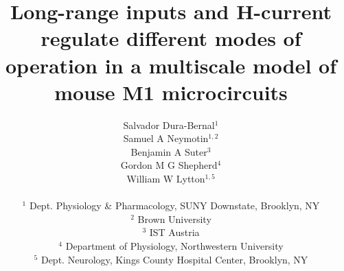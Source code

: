 \documentclass[]{article}
\begin{document}
\title{Long-range inputs and H-current regulate different modes of operation in a multiscale model of mouse M1 microcircuits}

\author{
Salvador Dura-Bernal$^{1}$\\
Samuel A Neymotin$^{1,2}$\\
Benjamin A Suter$^{3}$\\
Gordon M G Shepherd$^{4}$\\
William W Lytton$^{1,5}$\\
\\
$^1$ Dept. Physiology \& Pharmacology, SUNY Downstate, Brooklyn, NY \\
$^2$ Brown University \\
$^3$ IST Austria \\
$^4$ Department of Physiology, Northwestern University \\
$^5$ Dept. Neurology, Kings County Hospital Center, Brooklyn, NY}

\titlepage
\maketitle







\def\bpath{bib}

\end{document}
